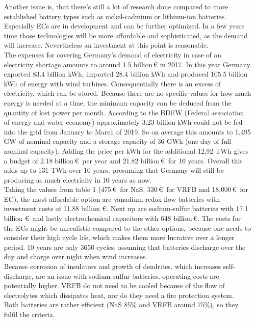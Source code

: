 \documentclass[12pt,a4paper]{article}
\begin{document}
\begin{parcolumns}[colwidths={1=2.5 cm, 2=10 cm, 3=2.5cm}]{3}
{Another issue is, that there's still a lot of research done compared to more established battery types such as nickel-cadmium or lithium-ion batteries. Especially ECs are in development and can be further optimized. In a few years time those technologies will be more affordable and sophisticated, as the demand will increase. Nevertheless an investment at this point is reasonable. 
\\
The expenses for covering Germany's demand of electricity in case of an electricity shortage amounts to around 1.5 billion\,\euro\,\,in 2017. In this year Germany exported 83.4 billion kWh, imported 28.4 billion kWh and produced 105.5 billion kWh of energy with wind turbines. Consequentially there is an excess of electricity, which can be stored. Because there are no specific values for how much energy is needed at a time, the minimum capacity can be deduced from the quantity of lost power per month. According to the BDEW (Federal association of energy and water economy) approximately 3.23 billion kWh could not be fed into the grid from January to March of 2019. So on average this amounts to 1.495 GW of nominal capacity and a storage capacity of 36 GWh (one day of full nominal capacity). Adding the price per kWh for the additional 12,92 TWh gives a budget of 2.18 billion\,\euro\, per year and 21.82 billion\,\euro\, for 10 years. Overall this adds up to 131 TWh over 10 years, presuming that Germany will still be producing as much electricity in 10 years as now.  \\
Taking the values from table 1 (475\,\euro\, for NaS, 330\,\euro\, for VRFB and 18,000\,\euro\, for EC), the most affordable option are vanadium redox flow batteries with investment costs of 11.88 billion \euro. Next up are sodium-sulfur batteries with 17.1 billion \euro\, and lastly electrochemical capacitors with 648 billion\,\euro. The costs for the ECs might be unrealistic compared to the other options, because one needs to consider their high cycle life, which makes them more lucrative over a longer period. 10 years are only 3650 cycles, assuming that batteries discharge over the day and charge over night when wind increases. \\
Because corrosion of insulators and growth of dendrites, which increases self-discharge, are an issue with sodium-sulfur batteries, operating costs are potentially higher. VRFB do not need to be cooled because of the flow of electrolytes which dissipates heat, nor do they need a fire protection system. \\
Both batteries are rather efficient (NaS 85$\%$ and VRFB around 75$\%$), so they fulfil the criteria.
}
\end{parcolumns}
\end{document}
